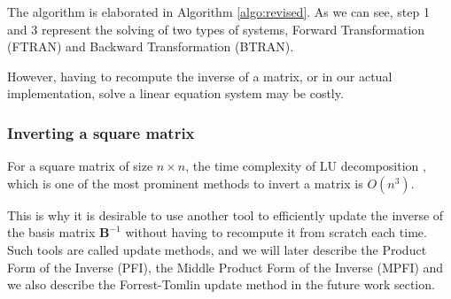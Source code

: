 The algorithm is elaborated in Algorithm \ref{algo:revised}. As we can see, step 1 and 3 represent the solving of two types of systems, Forward Transformation (FTRAN) and Backward Transformation (BTRAN).

However, having to recompute the inverse of a matrix, or in our actual
implementation, solve a linear equation system may be costly.

\subsubsection{Inverting a square matrix}
For a square matrix of size \(n \times n\), the time complexity of LU
decomposition
\parencite{golub2013matrix},
which is one of the
most prominent methods to invert a matrix is $O(n^3) $.

This is why it is desirable to use another tool to efficiently
update the inverse of the basis matrix $\mathbf{B}^{-1}$
without having to recompute it from scratch each time.
Such tools are called update methods,
and we will later describe the Product Form of the Inverse (PFI),
the Middle Product Form of the Inverse (MPFI) and we also describe the Forrest-Tomlin update method
in the future work section.

